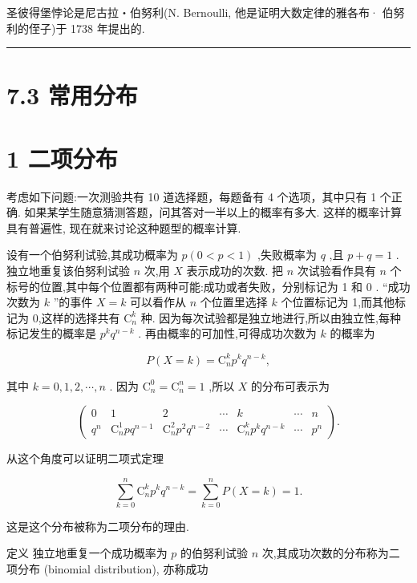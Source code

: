 \documentclass[10pt]{article}
\newcommand{\HRule}{\begin{center}\rule{0.9\linewidth}{0.2mm}\end{center}}
\begin{document}
圣彼得堡悖论是尼古拉・伯努利(N. Bernoulli, 他是证明大数定律的雅各布· 伯努利的侄子)于 1738 年提出的.

\HRule

\section*{7.3 常用分布}

\section*{1 二项分布}

考虑如下问题:一次测验共有 10 道选择题，每题备有 4 个选项，其中只有 1 个正确. 如果某学生随意猜测答题，问其答对一半以上的概率有多大. 这样的概率计算具有普遍性, 现在就来讨论这种题型的概率计算.

设有一个伯努利试验,其成功概率为 \(p\left( {0 < p < 1}\right)\) ,失败概率为 \(q\) ,且 \(p + q = 1\) . 独立地重复该伯努利试验 \(n\) 次,用 \(X\) 表示成功的次数. 把 \(n\) 次试验看作具有 \(n\) 个标号的位置,其中每个位置都有两种可能:成功或者失败，分别标记为 1 和 0 . “成功次数为 \(k\) ”的事件 \(X = k\) 可以看作从 \(n\) 个位置里选择 \(k\) 个位置标记为 1,而其他标记为 0,这样的选择共有 \({\mathrm{C}}_{n}^{k}\) 种. 因为每次试验都是独立地进行,所以由独立性,每种标记发生的概率是 \({p}^{k}{q}^{n - k}\) . 再由概率的可加性,可得成功次数为 \(k\) 的概率为

\[
P\left( {X = k}\right)  = {\mathrm{C}}_{n}^{k}{p}^{k}{q}^{n - k},
\]

其中 \(k = 0,1,2,\cdots ,n\) . 因为 \({\mathrm{C}}_{n}^{0} = {\mathrm{C}}_{n}^{n} = 1\) ,所以 \(X\) 的分布可表示为

\[
\left( \begin{matrix} 0 & 1 & 2 & \cdots & k & \cdots & n \\  {q}^{n} & {\mathrm{C}}_{n}^{1}p{q}^{n - 1} & {\mathrm{C}}_{n}^{2}{p}^{2}{q}^{n - 2} & \cdots & {\mathrm{C}}_{n}^{k}{p}^{k}{q}^{n - k} & \cdots & {p}^{n} \end{matrix}\right) .
\]

从这个角度可以证明二项式定理

\[
\mathop{\sum }\limits_{{k = 0}}^{n}{\mathrm{C}}_{n}^{k}{p}^{k}{q}^{n - k} = \mathop{\sum }\limits_{{k = 0}}^{n}P\left( {X = k}\right)  = 1.
\]

这是这个分布被称为二项分布的理由.

定义 独立地重复一个成功概率为 \(p\) 的伯努利试验 \(n\) 次,其成功次数的分布称为二项分布 (binomial distribution), 亦称成功
\end{document}
